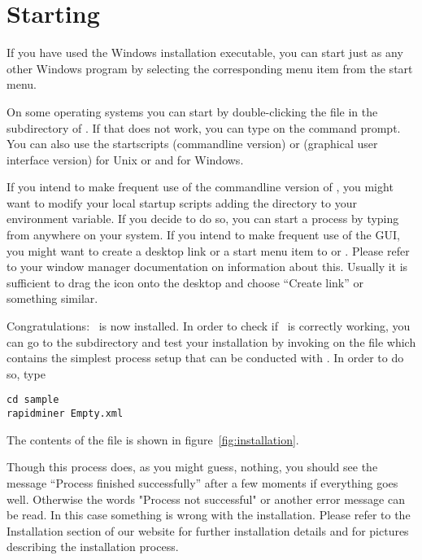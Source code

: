 \section{Starting \rapidminer}

If you have used the Windows installation executable, you can start \rapidminer just
as any other Windows program by selecting the corresponding menu item from the
start menu.

On some operating systems you can start \rapidminer by double-clicking
the file  in the  subdirectory of \rapidminer. If
that does not work, you can type
 on the command prompt. You can also use
the startscripts  (commandline version) or
 (graphical user interface version) for
Unix or  and  for
Windows.

If you intend to make frequent use of the commandline version of
\rapidminer, you might want to modify your local startup scripts adding the
 directory to your 
environment variable. If you decide to do so, you can start a
process by typing  from anywhere
on your system. If you intend to make frequent use of the GUI, you
might want to create a desktop link or a start menu item to
 or . Please refer to
your window manager documentation on information about this. Usually
it is sufficient to drag the icon onto the desktop and choose "`Create
link"' or something similar.

Congratulations: \rapidminer\ is now installed. In order to check if \rapidminer\ is
correctly working, you can go to the  subdirectory
and test your installation by invoking \rapidminer on the file
 which contains the simplest process setup that can
be conducted with \rapidminer. In order to do so, type
\begin{verbatim}
cd sample
rapidminer Empty.xml
\end{verbatim}
The contents of the file  is shown in
figure~\ref{fig:installation}. 

Though this process does, as you might guess, nothing,
you should see the message ``Process finished successfully'' after 
a few moments if everything goes well. Otherwise
the words "Process not successful" or another error message can be
read. In this case something is wrong with the installation.
Please refer to the Installation section of our website \rapidminerurl{} for further
installation details and for pictures describing the installation
process. 


